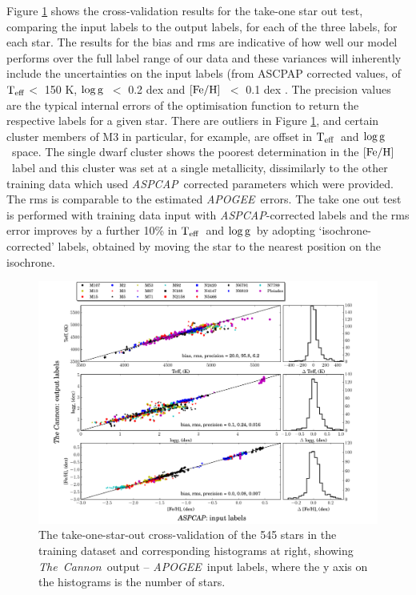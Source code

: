 \documentclass[12pt, preprint]{aastex}
\newcommand{\teff}{\mbox{$\rm T_{eff}$}}
\newcommand{\feh}{\mbox{$\rm [Fe/H]$}}
\newcommand{\logg}{\mbox{$\rm \log g$}}
\newcommand{\tc}{\textsl{The~Cannon}}
\newcommand{\apogee}{\textsl{APOGEE}}
\newcommand{\aspcap}{\textsl{ASPCAP}}
\begin{document}
Figure \ref{fig:takeonestarout} shows the cross-validation results for the take-one star out test, comparing the input labels to the output labels, for each of the three labels, for each star. The results for the bias and rms are indicative of how well our model performs over the full label range of our data and these variances will inherently include the uncertainties on the input labels (from ASCPAP corrected values, of \teff $<$ 150 K, \logg\ $<$ 0.2 dex and \feh\ $<$ 0.1 dex \citep{Meszaros2013}. The precision values are the typical internal errors of the optimisation function to return the respective labels for a given star. There are outliers in Figure \ref{fig:takeonestarout}, and certain cluster members of M3 in particular, for example,  are offset in \teff\ and \logg\ space. The single dwarf cluster shows the poorest determination in the \feh\ label and this cluster was set at a single metallicity, dissimilarly to the other training data which used \aspcap\ corrected parameters which were provided. The rms is comparable to the estimated \apogee\ errors. The take one out test is performed with training data input with \aspcap-corrected labels and the rms error improves by a further 10\% in \teff\ and \logg\  by adopting `isochrone-corrected' labels, obtained by moving the star to the nearest position on the isochrone. 

\begin{figure}[h!]
\centering
    \includegraphics[scale=0.45]{./plots/takeout_hist.pdf}
\caption{The take-one-star-out cross-validation of the 545 stars in the training dataset and corresponding histograms at right, showing \tc\ output -- \apogee\ input labels, where the y axis on the histograms is the number of stars.}
\label{fig:takeonestarout}
\end{figure}
\end{document}
